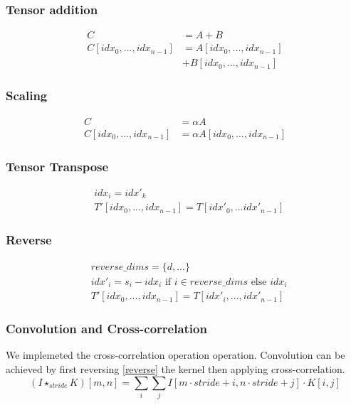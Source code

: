 \documentclass[conference]{IEEEtran}
\begin{document}
\subsubsection{Tensor addition}
\begin{equation}
\begin{split}
C &= A + B\\    
C[idx_0,...,idx_{n-1}] &= A[idx_0,..., idx_{n-1}] \\ &+B[idx_0,..., idx_{n-1}]
\end{split}\label{add}
\end{equation}

\subsubsection{Scaling}
\begin{equation}
\begin{split}
C &= \alpha A \\    
C[idx_0,...,idx_{n-1}] &= \alpha A[idx_0,..., idx_{n-1}]
\end{split}\label{scale}
\end{equation}

\subsubsection{Tensor Transpose}
\begin{equation}
\begin{split}    
&idx_i = idx'_k\\
&T'[idx_0,...,idx_{n-1}] = T[idx'_0,...idx'_{n-1}]
\end{split}\label{tranpose}
\end{equation}

\subsubsection{Reverse}
\begin{equation}
\begin{split}
&reverse\_dims = \{d,...\} \\
&idx'_i = s_i - idx_i \text{ if } i \in reverse\_dims \text{ else } idx_i \\
&T'[idx_0,...,idx_{n-1}] = T[idx'_i,...,idx'_{n-1}]
\end{split}\label{reverse}
\end{equation}

\subsubsection{Convolution and Cross-correlation}
We implemeted the cross-correlation operation operation.
Convolution can be achieved by first reversing \ref{reverse} the kernel then applying cross-correlation.
\begin{equation}
(I \star_{stride} K)[m, n] = \sum_i \sum_j I[m\cdot stride + i, n \cdot stride+ j] \cdot K[i, j]
\end{equation}
\end{document}
